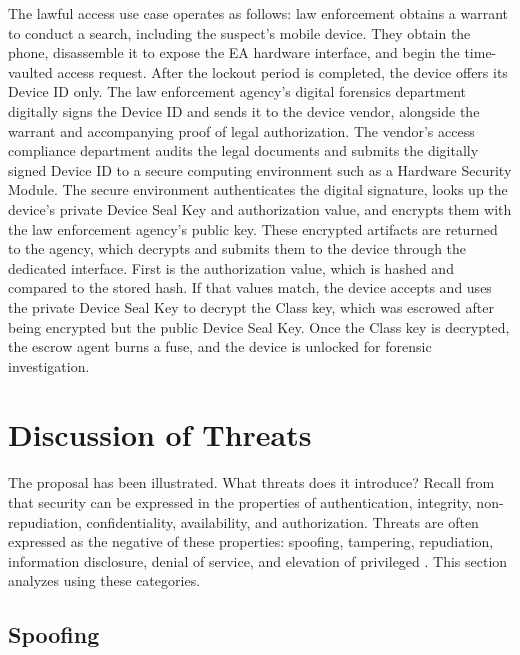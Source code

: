 The lawful access use case operates as follows: law enforcement obtains a warrant to conduct a search, including the
suspect's mobile device. They obtain the phone, disassemble it to expose the \ac{EA} hardware interface, and begin the
time-vaulted access request. After the lockout period is completed, the device offers its Device ID only. The law
enforcement agency's digital forensics department digitally signs the Device ID and sends it to the device vendor,
alongside the warrant and accompanying proof of legal authorization. The vendor's access compliance department audits
the legal documents and submits the digitally signed Device ID to a secure computing environment such as a Hardware
Security Module. The secure environment authenticates the digital signature, looks up the device's private Device Seal
Key and authorization value, and encrypts them with the law enforcement agency's public key. These encrypted artifacts
are returned to the agency, which decrypts and submits them to the device through the dedicated interface. First is
the authorization value, which is hashed and compared to the stored hash. If that values match, the device accepts and
uses the private Device Seal Key to decrypt the Class key, which was escrowed after being encrypted but the public
Device Seal Key. Once the Class key is decrypted, the escrow agent burns a fuse, and the device is unlocked for forensic
investigation.


\section{Discussion of Threats}
\label{sec-prop-threats}


The proposal has been illustrated. What threats does it introduce? Recall from  that security
can be expressed in the properties of authentication, integrity, non-repudiation, confidentiality, availability, and
authorization. Threats are often expressed as the negative of these properties: spoofing, tampering, repudiation,
information disclosure, denial of service, and elevation of privileged \cite{shostack_threat_2014}. This section
analyzes \ldawmsr using these categories.

\subsection{Spoofing}

